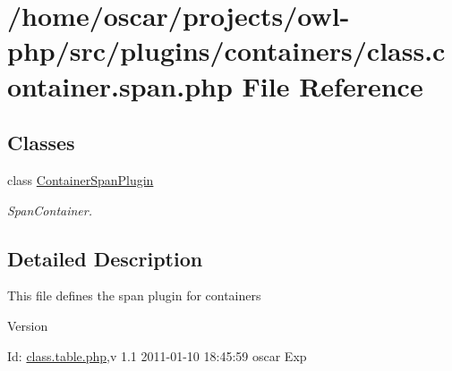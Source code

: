 \section{/home/oscar/projects/owl-\/php/src/plugins/containers/class.container.span.php File Reference}
\label{class_8container_8span_8php}
\subsection*{Classes}
\begin{DoxyCompactItemize}
\item 
class \hyperlink{classContainerSpanPlugin}{ContainerSpanPlugin}
\begin{DoxyCompactList}\small\item\em SpanContainer. \item\end{DoxyCompactList}\end{DoxyCompactItemize}


\subsection{Detailed Description}
This file defines the span plugin for containers \begin{DoxyVersion}{Version}

\end{DoxyVersion}
\begin{DoxyParagraph}{Id:}
\hyperlink{class_8table_8php}{class.table.php},v 1.1 2011-\/01-\/10 18:45:59 oscar Exp 
\end{DoxyParagraph}
